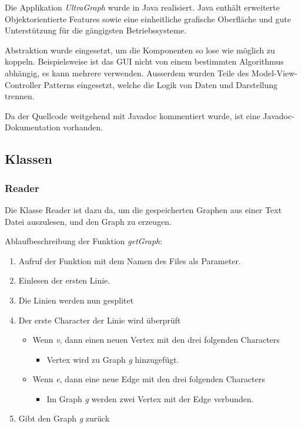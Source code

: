 \documentclass[a4paper,titlepage]{article}
\begin{document}
Die Applikation \emph{UltraGraph} wurde in Java realisiert. Java enthält erweiterte Objektorientierte Features sowie eine einheitliche grafische Oberfläche und gute Unterstützung für die gängigsten Betriebssysteme.

Abstraktion wurde eingesetzt, um die Komponenten so lose wie möglich zu koppeln. Beispielsweise ist das GUI nicht von einem bestimmten Algorithmus abhängig, es kann mehrere verwenden. Ausserdem wurden Teile des Model-View-Controller Patterns eingesetzt, welche die Logik von Daten und Darstellung trennen.

Da der Quellcode weitgehend mit Javadoc kommentiert wurde, ist eine Javadoc-Dokumentation vorhanden.

\subsection{Klassen}

\subsubsection{Reader}

Die Klasse Reader ist dazu da, um die gespeicherten Graphen aus einer Text Datei auszulesen, und den Graph zu erzeugen.

Ablaufbeschreibung der Funktion \emph{getGraph}:

\begin{enumerate}
\item Aufruf der Funktion mit dem Namen des Files als Parameter.
\item Einlesen der ersten Linie.
\item Die Linien werden nun gesplitet
\item Der erste Character der Linie wird überprüft
\begin{itemize}\item Wenn \emph{v}, dann einen neuen Vertex mit den drei folgenden Characters
\begin{itemize}\item Vertex wird zu Graph \emph{g} hinzugefügt.\end{itemize}\end{itemize}
\begin{itemize}\item Wenn \emph{e}, dann eine neue Edge mit den drei folgenden Characters
\begin{itemize}\item Im Graph \emph{g} werden zwei Vertex mit der Edge verbunden.\end{itemize}\end{itemize}
\item Gibt den Graph \emph{g} zurück
\end{enumerate}
\end{document}
